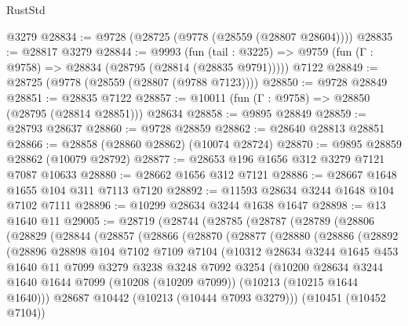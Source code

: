 \begin{lexlean}{RustStd}
\begin{coremodule}
    @3279
@28834 := @9728 (@28725 (@9778 (@28559 (@28807 @28604))))
@28835 := @28817 @3279
@28844 := @9993
    (fun (tail : @3225) => @9759 (fun (Γ : @9758) => @28834 (@28795 (@28814 (@28835 @9791)))))
    @7122
@28849 := @28725 (@9778 (@28559 (@28807 (@9788 @7123))))
@28850 := @9728 @28849
@28851 := @28835 @7122
@28857 := @10011 (fun (Γ : @9758) => @28850 (@28795 (@28814 @28851))) @28634
@28858 := @9895 @28849
@28859 := @28793 @28637
@28860 := @9728 @28859
@28862 := @28640 @28813 @28851
@28866 := @28858 (@28860 @28862) (@10074 @28724)
@28870 := @9895 @28859 @28862 (@10079 @28792)
@28877 := @28653 @196 @1656 @312 @3279 @7121 @7087 @10633
@28880 := @28662 @1656 @312 @7121
@28886 := @28667 @1648 @1655 @104 @311 @7113 @7120
@28892 := @11593 @28634 @3244 @1648 @104 @7102 @7111
@28896 := @10299 @28634 @3244 @1638 @1647
@28898 := @13 @1640 @11
@29005 := @28719
    (@28744
      (@28785
        (@28787
          (@28789
            (@28806
              (@28829
                (@28844
                  (@28857
                    (@28866
                      (@28870
                        (@28877
                          (@28880
                            (@28886
                              (@28892
                                (@28896
                                  @28898
                                  @104
                                  @7102
                                  @7109
                                  @7104
                                  (@10312
                                    @28634
                                    @3244
                                    @1645
                                    @453
                                    @1640
                                    @11
                                    @7099
                                    @3279
                                    @3238
                                    @3248
                                    @7092
                                    @3254
                                    (@10200
                                      @28634
                                      @3244
                                      @1640
                                      @1644
                                      @7099
                                      (@10208 (@10209 @7099))
                                      (@10213 (@10215 @1644 @1640)))
                                    @28687
                                    @10442
                                    (@10213 (@10444 @7093 @3279)))
                                  (@10451 (@10452 @7104))

\end{coremodule}
\end{lexlean}
